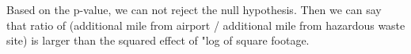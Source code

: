 \documentclass[11pt,reqno]{amsart}\usepackage[]{graphicx}\usepackage[]{color}
\newcommand{\ksp}{\vspace{0.1in}}   %
\begin{document}
\begin{enumerate}[(1)]
Based on the p-value, we can not reject the null hypothesis. Then we can say that ratio of (additional mile from airport / additional mile from hazardous waste site) is larger than the squared effect of "log of square footage.\\\\
\ksp


    
\end{enumerate}
\end{document}

